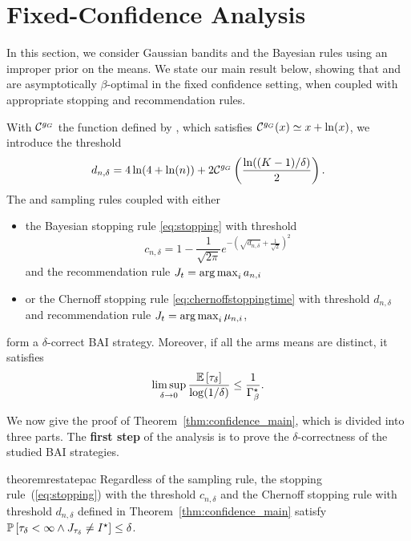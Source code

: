 \section{Fixed-Confidence Analysis}\label{sec:t3c.confidence}

In this section, we consider Gaussian bandits and the Bayesian rules using an improper prior on the means.
We state our main result below, showing that \TTTS and \TCC are asymptotically $\beta$-optimal in the fixed confidence setting, when coupled with appropriate stopping and recommendation rules. 

\begin{theorem}\label{thm:confidence_main} 
\begin{leftbar}[theorembar]
With $\mathcal{C}^{g_G}$ the function defined by \cite{kaufmann2018mixture}, which satisfies $\mathcal{C}^{g_G}(x) \simeq x+\ln(x)$, we introduce the threshold
\begin{equation}d_{n,\delta} = 4\ln(4+\ln(n)) + 2 \mathcal{C}^{g_G}\left(\frac{\ln((K-1)/\delta)}{2}\right).\label{def:thresholdD}\end{equation}
The \TTTS and \TCC sampling rules coupled with either   
\begin{itemize}
 \item the Bayesian stopping rule \eqref{eq:stopping} with threshold \[c_{n,\delta} = 1 - \frac{1}{\sqrt{2\pi}} e^{-\left(\sqrt{d_{n,\delta}} + \frac{1}{\sqrt{2}}\right)^2}\]
 and the recommendation rule $J_t = \operatorname*{arg\,max}_{i} a_{n,i}$
  \item or the Chernoff stopping rule \eqref{eq:chernoffstoppingtime} with threshold $d_{n,\delta}$
 and recommendation rule $J_t = \operatorname*{arg\,max}_i \mu_{n,i}$,
\end{itemize}
form a $\delta$-correct BAI strategy. Moreover, if all the arms means are distinct, it satisfies  
    \[
        \limsup_{\delta\rightarrow{0}} \frac{\mathbb{E}\left[\tau_{\delta}\right]}{\log(1/\delta)} \leq \frac{1}{\Gamma_{\beta}^\star}.
    \]
\end{leftbar}
\end{theorem}

We now give the proof of Theorem~\ref{thm:confidence_main}, which is divided into three parts. The \textbf{first step} of the analysis is to prove the $\delta$-correctness of the studied BAI strategies.

\begin{restatable}{theorem}{restatepac}\label{thm:pac_gaussian}
    Regardless of the sampling rule, the stopping rule~(\ref{eq:stopping}) with the threshold $c_{n,\delta}$ and the Chernoff stopping rule with threshold $d_{n,\delta}$ defined in Theorem~\ref{thm:confidence_main} satisfy $        \mathbb{P}\left[\tau_{\delta} < \infty \wedge J_{\tau_{\delta}} \neq I^\star\right] \leq \delta$.
\end{restatable}

